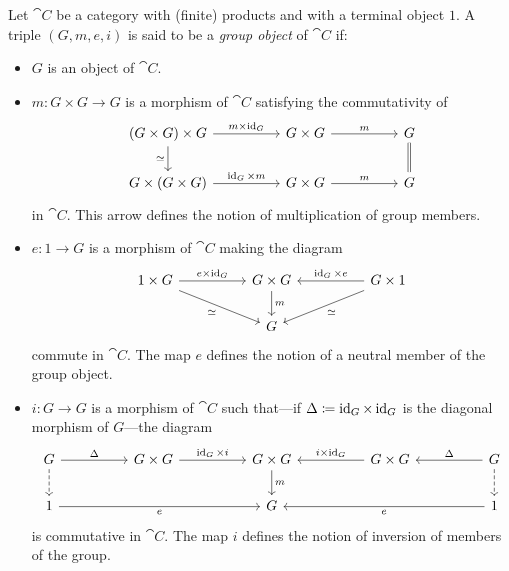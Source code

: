 \begin{definition}
\label{def:group-object}
Let \(\cat C\) be a category with (finite) products and with a terminal object
\(1\). A triple \((G, m, e, i)\) is said to be a \emph{group object} of
\(\cat C\) if:
\begin{itemize}\setlength\itemsep{0em}
\item \(G\) is an object of \(\cat C\).

\item \(m: G \times G \to G\) is a morphism of \(\cat C\) satisfying the
  commutativity of
  \[
  \begin{tikzcd}
  (G \times G) \times G \ar[d, "\dis"'] \ar[rr, "m \times \Id_G"]
  &
  &G \times G \ar[rr, "m"]
  &
  &G \ar[d, equals]
  \\
  G \times (G \times G) \ar[rr, "\Id_G \times m"]
  &
  &G \times G \ar[rr, "m"]
  &
  &G
  \end{tikzcd}
  \]
  in \(\cat C\). This arrow defines the notion of multiplication of group
  members.

\item \(e: 1 \to G\) is a morphism of \(\cat C\) making the diagram
  \[
  \begin{tikzcd}
  1 \times G \ar[rr, "e \times \Id_{G}"]
  \ar[rrd, "\dis"']
  &
  &G \times G \ar[d, "m"]
  &
  &G \times 1 \ar[ll, "\Id_G \times e"']
  \ar[lld, "\dis"]
  \\
  &
  &G
  &
  \end{tikzcd}
  \]
  commute in \(\cat C\). The map \(e\) defines the notion of a neutral member
  of the group object.

\item \(i: G \to G\) is a morphism of \(\cat C\) such that---if \(\Delta
  \coloneq \operatorname{id}_G \times \operatorname{id}_G\) is the diagonal morphism of \(G\)---the diagram
  \[
  \begin{tikzcd}
  G \ar[rr, "\Delta"] \ar[d, dashed]
  &
  &G \times G \ar[rr, "\Id_G \times i"]
  &
  &G \times G \ar[d, "m"]
  &
  &G \times G \ar[ll, "i \times \Id_G"']
  &
  &G \ar[d, dashed] \ar[ll, "\Delta"']
  \\
  1 \ar[rrrr, "e"']
  &
  &
  &
  &G
  &
  &
  &
  &1 \ar[llll, "e"]
  \end{tikzcd}
  \]
  is commutative in \(\cat C\). The map \(i\) defines the notion of inversion of
  members of the group.
\end{itemize}
\end{definition}

